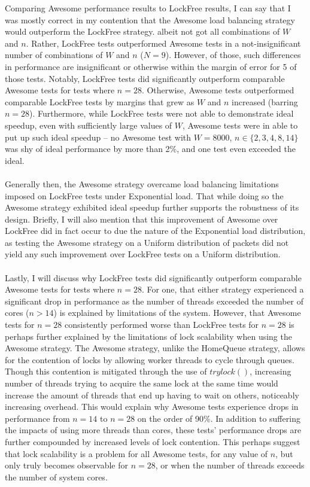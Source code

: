 \documentclass[]{article}
\begin{document}
Comparing Awesome performance results to LockFree results, I can say that I was mostly correct in my contention that the Awesome load balancing strategy would outperform the LockFree strategy. albeit not got all combinations of $W$ and $n$. Rather, LockFree tests outperformed Awesome tests in a not-insignificant number of combinations of $W$ and $n$ ($N  = 9$). However, of those, such differences in performance are insignificant or otherwise within the margin of error for 5 of those tests. Notably, LockFree tests did significantly outperform comparable Awesome tests for tests where $n = 28$. Otherwise, Awesome tests outperformed comparable LockFree tests by margins that grew as $W$ and $n$ increased (barring $n = 28$). Furthermore, while LockFree tests were not able to demonstrate ideal speedup, even with sufficiently large values of $W$, Awesome tests were in able to put up such ideal speedup -- no Awesome test with $W = 8000$, $n \in \{2, 3, 4, 8, 14\}$ was shy of ideal performance by more than 2\%, and one test even exceeded the ideal. 
\\\\
Generally then, the Awesome strategy overcame load balancing limitations imposed on LockFree tests under Exponential load. That while doing so the Awesome strategy exhibited ideal speedup further supports the robustness of its design. Briefly, I will also mention that this improvement of Awesome over LockFree did in fact occur to due the nature of the Exponential load distribution, as testing the Awesome strategy on a Uniform distribution of packets did not yield any such improvement over LockFree tests on a Uniform distribution.
\\\\
Lastly, I will discuss why LockFree tests did significantly outperform comparable Awesome tests for tests where $n = 28$. For one, that either strategy experienced a significant drop in performance as the number of threads exceeded the number of cores ($n > 14$) is explained by limitations of the system. However, that Awesome tests for $n = 28$ consistently performed worse than LockFree tests for $n = 28$ is perhaps further explained by the limitations of lock scalability when using the Awesome strategy. The Awesome strategy, unlike the HomeQueue strategy, allows for the contention of locks by allowing worker threads to cycle through queues. Though this contention is mitigated through the use of $trylock()$, increasing number of threads trying to acquire the same lock at the same time would increase the amount of threads that end up having to wait on others, noticeably increasing overhead. This would explain why Awesome tests experience drops in performance from $n = 14$ to $n = 28$ on the order of 90\%. In addition to suffering the impacts of using more threads than cores, these tests' performance drops are further compounded by increased levels of lock contention. This perhaps suggest that lock scalability is a problem for all Awesome tests, for any value of $n$, but only truly becomes observable for $n = 28$, or when the number of threads exceeds the number of system cores.
\end{document}
